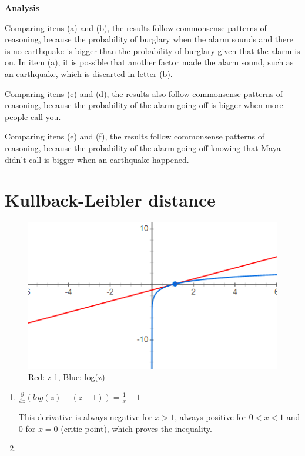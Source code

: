 \documentclass{article}
\begin{document}
\textbf{Analysis}

Comparing itens (a) and (b), the results follow commonsense patterns of reasoning, because the probability of burglary when the alarm sounds and there is no earthquake is bigger than the probability of burglary given that the alarm is on. In item (a), it is possible that another factor made the alarm sound, such as an earthquake, which is discarted in letter (b).\bigbreak

Comparing itens (c) and (d), the results also follow commonsense patterns of reasoning, because the probability of the alarm going off is bigger when more people call you.\bigbreak

Comparing itens (e) and (f), the results follow commonsense patterns of reasoning, because the probability of the alarm going off knowing that Maya didn't call is bigger when an earthquake happened.\bigbreak

\section{Kullback-Leibler distance}

\begin{figure}[h!]
  \includegraphics[scale=1]{graphic1.png}
  \centering
  \caption{Red: z-1, Blue: log(z)}
\end{figure}

\begin{enumerate}[label=(\alph*)]
\item
$\frac{\partial}{\partial z}(log(z)-(z-1))=\frac{1}{x}-1$

This derivative is always negative for $x > 1$, always positive for $0<x<1$ and 0 for $x=0$ (critic point), which proves the inequality.

\item

\end{enumerate}
\end{document}

